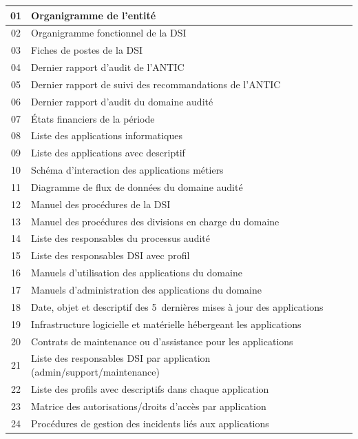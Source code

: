 \begin{longtable}{|c|p{8.5cm}|p{3.5cm}|}
    01 & Organigramme de l'entité & \\ \hline
    02 & Organigramme fonctionnel de la DSI & \\ \hline
    03 & Fiches de postes de la DSI & \\ \hline
    04 & Dernier rapport d'audit de l'ANTIC & \\ \hline
    05 & Dernier rapport de suivi des recommandations de l'ANTIC & \\ \hline
    06 & Dernier rapport d'audit du domaine audité & \\ \hline
    07 & États financiers de la période & \\ \hline
    08 & Liste des applications informatiques & \\ \hline
    09 & Liste des applications avec descriptif & \\ \hline
    10 & Schéma d'interaction des applications métiers & \\ \hline
    11 & Diagramme de flux de données du domaine audité & \\ \hline
    12 & Manuel des procédures de la DSI & \\ \hline
    13 & Manuel des procédures des divisions en charge du domaine & \\ \hline
    14 & Liste des responsables du processus audité & \\ \hline
    15 & Liste des responsables DSI avec profil & \\ \hline
    16 & Manuels d'utilisation des applications du domaine & \\ \hline
    17 & Manuels d'administration des applications du domaine & \\ \hline
    18 & Date, objet et descriptif des 5~dernières mises à jour des applications & \\ \hline
    19 & Infrastructure logicielle et matérielle hébergeant les applications & \\ \hline
    20 & Contrats de maintenance ou d'assistance pour les applications & \\ \hline
    21 & Liste des responsables DSI par application (admin/support/maintenance) & \\ \hline
    22 & Liste des profils avec descriptifs dans chaque application & \\ \hline
    23 & Matrice des autorisations/droits d'accès par application & \\ \hline
    24 & Procédures de gestion des incidents liés aux applications & \\ \hline

\end{longtable}
